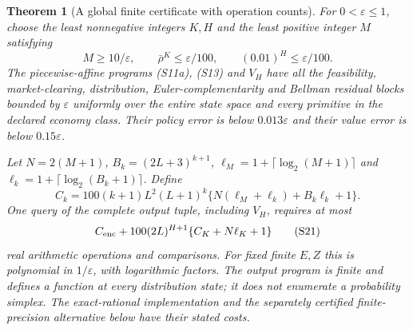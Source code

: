 \documentclass[11pt,a4paper]{article}
\newtheorem{theorem}{Theorem}
\begin{document}
\begin{theorem}[A global finite certificate with operation counts]
\label{thm:finite-solver}
For $0<\varepsilon\leq1$, choose the least nonnegative integers
$K,H$ and the least positive integer $M$ satisfying
\[
 M\geq10/\varepsilon,\qquad
 \bar\rho^K\leq\varepsilon/100,\qquad
 (0.01)^H\leq\varepsilon/100.
 \tag{S19}
\]
The piecewise-affine programs \textup{(S11a), (S13)} and $V_H$ have
all the feasibility, market-clearing, distribution,
Euler-complementarity and Bellman residual blocks bounded by
$\varepsilon$ uniformly over the entire state space and every
primitive in the declared economy class. Their policy error is below
$0.013\varepsilon$ and their value error is below $0.15\varepsilon$.

Let $N=2(M+1)$, $B_k=(2L+3)^{k+1}$,
$\ell_M=1+\lceil\log_2(M+1)\rceil$ and
$\ell_k=1+\lceil\log_2(B_k+1)\rceil$. Define
\[
 C_k=100(k+1)L^2(L+1)^k
 \{N(\ell_M+\ell_k)+B_k\ell_k+1\}.
 \tag{S20}
\]
One query of the complete output tuple, including $V_H$, requires at
most
\[
 C_{\rm enc}
 +100(2L)^{H+1}\{C_K+N\ell_K+1\}
 \tag{S21}
\]
real arithmetic operations and comparisons. For fixed finite $E,Z$
this is polynomial in $1/\varepsilon$, with logarithmic factors.
The output program is finite and defines a function at every
distribution state; it does not enumerate a probability simplex.
The exact-rational implementation and the separately certified
finite-precision alternative below have their stated costs.
\end{theorem}
\end{document}
